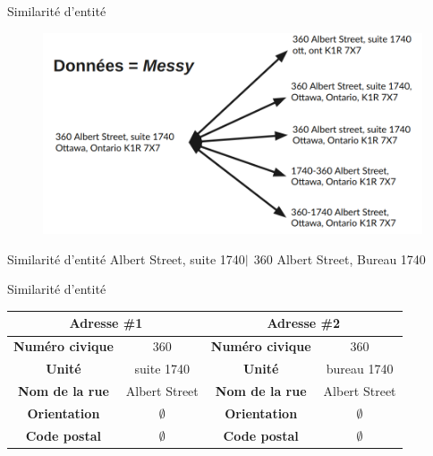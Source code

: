 \documentclass{beamer}
\begin{document}
	\begin{frame}{Similarité d'entité}
		\begin{figure}
			\centering
			\includegraphics[width=0.7\linewidth]{img/messy}
		\end{figure}
	\end{frame}
	
	\begin{frame}{Similarité d'entité}
		 Albert Street, suite 1740$\arrowvert$ 360 Albert Street, Bureau 1740
	\end{frame}
	
	\begin{frame}{Similarité d'entité}
		\centering
		\begin{tabular}{cc|cc}
			\multicolumn{2}{c}{\textbf{Adresse \#1}} & \multicolumn{2}{c}{\textbf{Adresse \#2}}\\
			\toprule
			\textbf{Numéro civique} & 360  &\textbf{Numéro civique} & 360\\
			\textbf{Unité} & suite 1740 & \textbf{Unité} & bureau 1740 \\
			\textbf{Nom de la rue}  & Albert Street & \textbf{Nom de la rue}  & Albert Street\\
			\textbf{Orientation}    & $\emptyset$   & \textbf{Orientation}    & $\emptyset$  \\
			\textbf{Code postal}    & $\emptyset$ & \textbf{Code postal}    & $\emptyset$\\
		\end{tabular}
	\end{frame}
	
\end{document}
